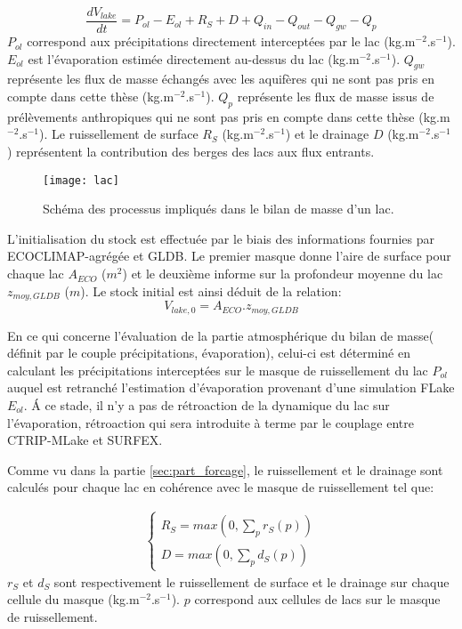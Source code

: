 \begin{equation}
\frac{dV_{lake}}{dt} = P_{ol}-E_{ol} +  R_{S}+ D +  Q_{in} - Q_{out} - Q_{gw} - Q_{p}
\end{equation}
$P_{ol}$ correspond aux précipitations directement interceptées par le lac (kg.m$^{-2}$.s$^{-1}$). $E_{ol}$ est l'évaporation estimée directement au-dessus du lac (kg.m$^{-2}$.s$^{-1}$). $Q_{gw}$ représente les flux de masse échangés avec les aquifères qui ne sont pas pris en compte dans cette thèse (kg.m$^{-2}$.s$^{-1}$). $Q_{p}$ représente les flux de masse issus de prélèvements anthropiques qui ne sont pas pris en compte dans cette thèse (kg.m$^{-2}$.s$^{-1}$).
Le ruissellement de surface $R_{S}$ (kg.m$^{-2}$.s$^{-1}$) et le drainage $D$ (kg.m$^{-2}$.s$^{-1}$) représentent la contribution des berges des lacs aux flux entrants.\\

\begin{figure}[h!]
  \texttt{[image: lac]}
  \caption{Schéma des processus impliqués dans le bilan de masse d'un lac.}
  \label{masslake}
\end{figure}

\noindent L'initialisation du stock est effectuée par le biais des informations fournies par ECOCLIMAP-agrégée et GLDB. Le premier masque donne l'aire de surface pour chaque lac $A_{ECO}$ ($m^{2}$) et le deuxième informe sur la profondeur moyenne du lac $z_{moy,GLDB}$ ($m$). Le stock initial est ainsi déduit de la relation:
\begin{equation}
V_{lake,0} = A_{ECO}.z_{moy,GLDB}
\end{equation}

\noindent En ce qui concerne l'évaluation de la partie atmosphérique du bilan de masse( définit par le couple {précipitations, évaporation}), celui-ci est déterminé en calculant les précipitations interceptées sur le masque de ruissellement du lac $P_{ol}$ auquel est retranché l'estimation d'évaporation provenant d'une simulation FLake $E_{ol}$. \'A ce stade, il n'y a pas de rétroaction de la dynamique du lac sur l'évaporation, rétroaction qui sera introduite à terme par le couplage entre CTRIP-MLake et SURFEX. 

\noindent Comme vu dans la partie \ref{sec:part_forcage}, le ruissellement et le drainage sont calculés pour chaque lac en cohérence avec le masque de ruissellement tel que:

\begin{align}\label{mlake_rd}
\begin{cases}
 R_{S} = max(0, \sum_{p} r_{S}(p))\\
 D = max(0, \sum_{p} d_{S}(p))
\end{cases}
\end{align}
$r_{S}$ et $d_{S}$ sont respectivement le ruissellement de surface et le drainage sur chaque cellule du masque (kg.m$^{-2}$.s$^{-1}$). $p$ correspond aux cellules de lacs sur le masque de ruissellement. \\

